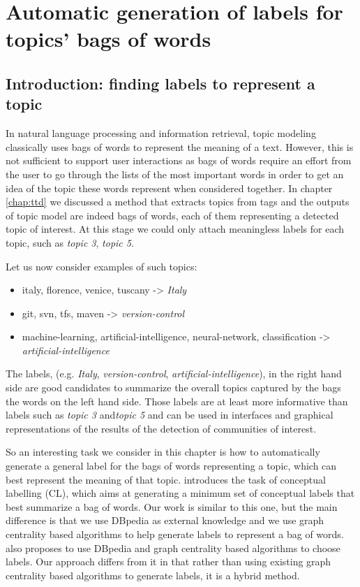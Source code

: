 \chapter{Automatic generation of labels for topics' bags of words}
\doublespacing
\label{chap:label}
\minitoc



\section{Introduction: finding labels to represent a topic}
In natural language processing and information retrieval, topic modeling classically uses bags of words to represent the meaning of a text. However, this is not sufficient to support user interactions as bags of words require an effort from the user to go through the lists of the most important words in order to get an idea of the topic these words represent when considered together.
In chapter \ref{chap:ttd} we discussed a method that extracts topics from tags and the outputs of topic model are indeed bags of words, each of them representing a detected topic of interest. At this stage we could only attach meaningless labels for each topic, such as \textit{topic 3}, \textit{topic 5}.

Let us now consider examples of such topics: 
\begin{itemize}
    \item {italy, florence, venice, tuscany -> \textit{Italy}}
    \item {git, svn, tfs, maven -> \textit{version-control}}
    \item {machine-learning, artificial-intelligence, neural-network, classification -> \textit{artificial-intelligence}}
\end{itemize}

The labels, (e.g. \textit{Italy}, \textit{version-control}, \textit{artificial-intelligence}), in the right hand side are good candidates to summarize the overall topics captured by the bags the words on the left hand side. Those labels are at least more informative than labels such as \textit{topic 3} and\textit{topic 5} and can be used in interfaces and graphical representations of the results of the detection of communities of interest.

So an interesting task we consider in this chapter is how to automatically generate a general label for the bags of words representing a topic, which can best represent the meaning of that topic. \cite{chp6OnConceptualLabelingOfBagOfWords} introduces the task of conceptual labelling (CL), which aims at generating a minimum set of conceptual labels that best summarize a bag of words. Our work is similar to this one, but the main difference is that we use DBpedia as external knowledge and we use graph centrality based algorithms to help generate labels to represent a bag of words. \cite{chp2hulpus2013unsupervisedtopiclabeling} also proposes to use DBpedia and graph centrality based algorithms to choose labels. Our approach differs from it in that rather than using existing graph centrality based algorithms to generate labels, it is a hybrid method. 



